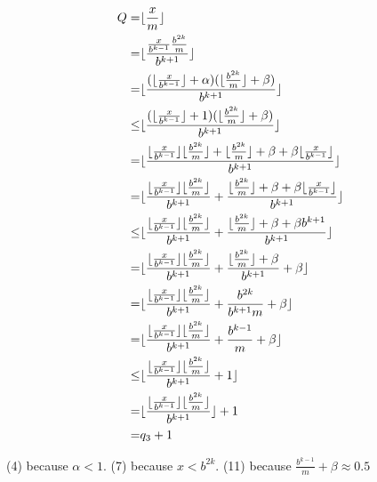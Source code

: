\documentclass{article}
\DeclarePairedDelimiter\floor{\lfloor}{\rfloor}
\begin{document}
\begin{align}
    Q = & \floor{\frac{x}{m}}\\ 
    = & \floor{\frac{\frac{x}{b^{k-1}}\frac{b^{2k}}{m}} {b^{k+1}}} \\
    = & \floor{
        \frac
        {
            (\floor{\frac{x}{b^{k-1}}} + \alpha
            )
            (
            \floor{\frac{b^{2k}}{m}} + \beta
            )
        }
        {b ^{k+1}}
    } \\
    \le & \floor{
        \frac
        {
            (\floor{\frac{x}{b^{k-1}}} + 1
            )
            (
            \floor{\frac{b^{2k}}{m}} + \beta
            )
        }
        {b ^{k+1}}
    } \\ 
    = & \floor{
        \frac
        {
            \floor{\frac{x}{b^{k-1}}} \floor{\frac{b^{2k}}{m}} + \floor{\frac{b^{2k}}{m}} + \beta + \beta \floor{\frac{x}{b^{k-1}}}
        }
        {b ^{k+1}}
    } \\ 
    = & \floor{
        \frac
        {
            \floor{\frac{x}{b^{k-1}}} \floor{\frac{b^{2k}}{m}}
        }
        {b ^{k+1}}
        +
        \frac
        {
            \floor{\frac{b^{2k}}{m}} + \beta + \beta \floor{\frac{x}{b^{k-1}}}
        }
        {b ^{k+1}}
    } \\
    \le & \floor{
        \frac
        {
            \floor{\frac{x}{b^{k-1}}} \floor{\frac{b^{2k}}{m}}
        }
        {b ^{k+1}}
        +
        \frac
        {
            \floor{\frac{b^{2k}}{m}} + \beta + \beta {b^{k+1}}
        }
        {b ^{k+1}}
    } \\
    = & \floor{
        \frac
        {
            \floor{\frac{x}{b^{k-1}}} \floor{\frac{b^{2k}}{m}}
        }
        {b ^{k+1}}
        +
        \frac
        {
            \floor{\frac{b^{2k}}{m}} + \beta
        }
        {b ^{k+1}} + \beta
    } \\
    = & \floor{
        \frac
        {
            \floor{\frac{x}{b^{k-1}}} \floor{\frac{b^{2k}}{m}}
        }
        {b ^{k+1}}
        +
        \frac
        {
            b^{2k}
        }
        {b ^{k+1}m} + \beta
    } \\
    = & \floor{
        \frac
        {
            \floor{\frac{x}{b^{k-1}}} \floor{\frac{b^{2k}}{m}}
        }
        {b ^{k+1}}
        +
        \frac
        {
            b^{k-1}
        }
        {m} + \beta
    } \\
    \le & \floor{
        \frac
        {
            \floor{\frac{x}{b^{k-1}}} \floor{\frac{b^{2k}}{m}}
        }
        {b ^{k+1}}
        +
        1
    } \\
    = & \floor{
        \frac
        {
            \floor{\frac{x}{b^{k-1}}} \floor{\frac{b^{2k}}{m}}
        }
        {b ^{k+1}}
        }
        +
        1 \\
    = & q_3
        +
        1
\end{align}

(4) because $\alpha < 1$. (7) because $x < b^{2k}$. (11) because $\frac{b^{k-1}}{m} + \beta \approx 0.5$
\end{document}

